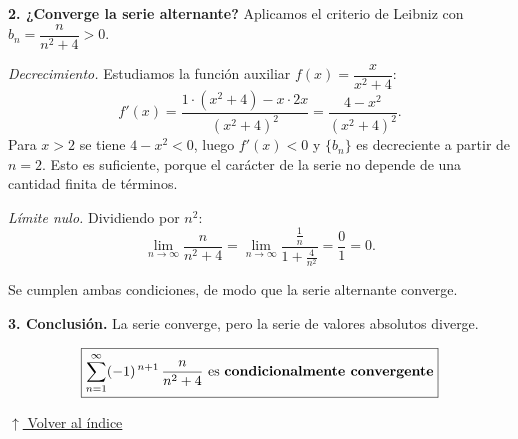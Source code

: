 \documentclass[12pt]{article}
\newcommand{\volverindice}{%
    \vspace{1em}%
    \begin{flushright}%
        \hyperlink{indice}{\small $\uparrow$ Volver al índice}%
    \end{flushright}%
}
\begin{document}
\begin{enumerate}[label=\alph*.-]
    \textbf{2. ¿Converge la serie alternante?} Aplicamos el criterio de Leibniz
    con $b_n=\dfrac{n}{n^{2}+4}>0$.

    \emph{Decrecimiento.} Estudiamos la función auxiliar
    $f(x)=\dfrac{x}{x^{2}+4}$:
    \[
    f'(x)=\frac{1\cdot(x^{2}+4)-x\cdot 2x}{(x^{2}+4)^{2}}
    =\frac{4-x^{2}}{(x^{2}+4)^{2}} .
    \]
    Para $x>2$ se tiene $4-x^{2}<0$, luego $f'(x)<0$ y $\{b_n\}$ es decreciente
    a partir de $n=2$. Esto es suficiente, porque el carácter de la serie no
    depende de una cantidad finita de términos.

    \emph{Límite nulo.} Dividiendo por $n^{2}$:
    \[
    \lim_{n\to\infty}\frac{n}{n^{2}+4}
    =\lim_{n\to\infty}\frac{\frac1n}{1+\frac{4}{n^{2}}}
    =\frac{0}{1}=0 .
    \]

    Se cumplen ambas condiciones, de modo que la serie alternante converge.

    \textbf{3. Conclusión.} La serie converge, pero la serie de valores
    absolutos diverge.

    \[
    \boxed{
    \sum_{n=1}^{\infty}(-1)^{\,n+1}\,\frac{n}{n^{2}+4}
    \text{ es \textbf{condicionalmente convergente}}
    }
    \]

\end{enumerate}

\volverindice
\newpage
\end{document}
